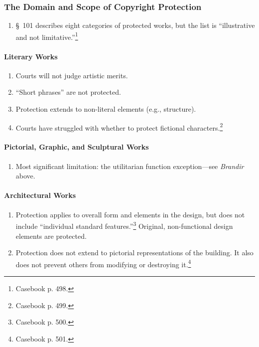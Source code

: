 \subsubsection{The Domain and Scope of Copyright Protection}

\begin{enumerate}
    \item \S\ 101 describes eight categories of protected works, but the list 
    is ``illustrative and not limitative.''\footnote{Casebook p. 498.}
\end{enumerate}

\paragraph{Literary Works}

\begin{enumerate}
    \item Courts will not judge artistic merits.
    \item ``Short phrases'' are not protected.
    \item Protection extends to non-literal elements (e.g., structure).
    \item Courts have struggled with whether to protect fictional 
    characters.\footnote{Casebook p. 499.}
\end{enumerate}

\paragraph{Pictorial, Graphic, and Sculptural Works}

\begin{enumerate}
    \item Most significant limitation: the utilitarian function 
    exception---see \emph{Brandir} above.
\end{enumerate}

\paragraph{Architectural Works}

\begin{enumerate}
    \item Protection applies to overall form and elements in the design, but 
    does not include ``individual standard features.''\footnote{Casebook p. 
    500.} Original, non-functional design elements are protected.
    \item Protection does not extend to pictorial representations of the 
    building. It also does not prevent others from modifying or destroying 
    it.\footnote{Casebook p. 501.}
\end{enumerate}

